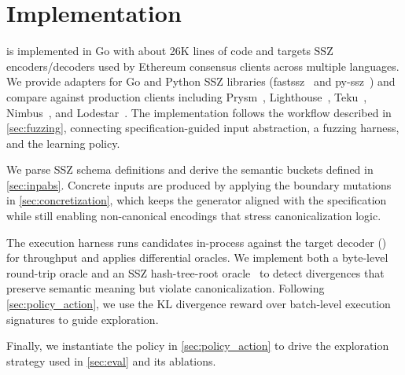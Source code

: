 \section{Implementation}\label{sec:impl}

\tool is implemented in Go with about 26K lines of code and targets SSZ encoders/decoders used by Ethereum consensus clients across multiple languages. We provide adapters for Go and Python SSZ libraries (fastssz~\cite{fastssz} and py-ssz~\cite{pyssz}) and compare against production clients including Prysm~\cite{prysm}, Lighthouse~\cite{lighthouse}, Teku~\cite{teku}, Nimbus~\cite{nimbus}, and Lodestar~\cite{lodestar}. The implementation follows the workflow described in \autoref{sec:fuzzing}, connecting specification-guided input abstraction, a fuzzing harness, and the learning policy.

We parse SSZ schema definitions and derive the semantic buckets defined in \autoref{sec:inpabs}. Concrete inputs are produced by applying the boundary mutations in \autoref{sec:concretization}, which keeps the generator aligned with the specification while still enabling non-canonical encodings that stress canonicalization logic.

The execution harness runs candidates in-process against the target decoder () for throughput and applies differential oracles. We implement both a byte-level round-trip oracle and an SSZ hash-tree-root oracle~\cite{sszspec} to detect divergences that preserve semantic meaning but violate canonicalization. Following \autoref{sec:policy_action}, we use the KL divergence reward over batch-level execution signatures to guide exploration.

Finally, we instantiate the policy in \autoref{sec:policy_action} to drive the exploration strategy used in \autoref{sec:eval} and its ablations.
